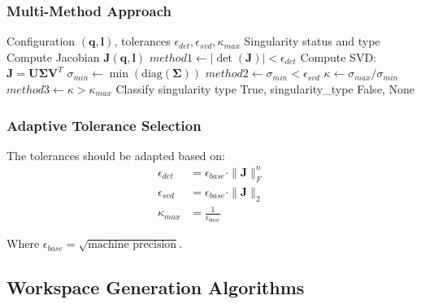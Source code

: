 \documentclass[11pt,a4paper]{article}
\begin{document}
\subsubsection{Multi-Method Approach}
\begin{algorithm}
\caption{Comprehensive Singularity Detection}
\begin{algorithmic}[1]
\REQUIRE Configuration $(\bm{q}, \bm{l})$, tolerances $\epsilon_{det}, \epsilon_{svd}, \kappa_{max}$
\ENSURE Singularity status and type
\STATE Compute Jacobian $\bm{J}(\bm{q}, \bm{l})$
\STATE $method1 \leftarrow |\det(\bm{J})| < \epsilon_{det}$
\STATE Compute SVD: $\bm{J} = \bm{U}\bm{\Sigma}\bm{V}^T$
\STATE $\sigma_{min} \leftarrow \min(\text{diag}(\bm{\Sigma}))$
\STATE $method2 \leftarrow \sigma_{min} < \epsilon_{svd}$
\STATE $\kappa \leftarrow \sigma_{max}/\sigma_{min}$
\STATE $method3 \leftarrow \kappa > \kappa_{max}$
    \STATE Classify singularity type
    \RETURN True, singularity\_type
\ELSE
    \RETURN False, None
\ENDIF
\end{algorithmic}
\end{algorithm}

\subsubsection{Adaptive Tolerance Selection}
The tolerances should be adapted based on:
\begin{align}
\epsilon_{det} &= \epsilon_{base} \cdot \|\bm{J}\|_F^{n} \\
\epsilon_{svd} &= \epsilon_{base} \cdot \|\bm{J}\|_2 \\
\kappa_{max} &= \frac{1}{\epsilon_{base}}
\end{align}

Where $\epsilon_{base} = \sqrt{\text{machine precision}}$.

\subsection{Workspace Generation Algorithms}
\end{document}
